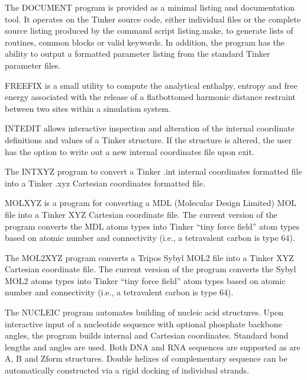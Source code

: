 \documentclass[letterpaper,11pt,english]{sphinxmanual}
\begin{document}

The DOCUMENT program is provided as a minimal listing and documentation tool. It operates on the Tinker source code, either individual files or the complete source listing produced by the command script listing.make, to generate lists of routines, common blocks or valid keywords. In addition, the program has the ability to output a formatted parameter listing from the standard Tinker parameter files.


FREEFIX is a small utility to compute the analytical enthalpy, entropy and free energy associated with the release of a flat\sphinxhyphen{}bottomed harmonic distance restraint between two sites within a simulation system.


INTEDIT allows interactive inspection and alteration of the internal coordinate definitions and values of a Tinker structure. If the structure is altered, the user has the option to write out a new internal coordinates file upon exit.


The INTXYZ program to convert a Tinker .int internal coordinates formatted file into a Tinker .xyz Cartesian coordinates formatted file.


MOLXYZ is a program for converting a MDL (Molecular Design Limited) MOL file into a Tinker XYZ Cartesian coordinate file. The current version of the program converts the MDL atoms types into Tinker “tiny force field” atom types based on atomic number and connectivity (i.e., a tetravalent carbon is type 64).


The MOL2XYZ program converts a Tripos Sybyl MOL2 file into a Tinker XYZ Cartesian coordinate file. The current version of the program converts the Sybyl MOL2 atoms types into Tinker “tiny force field” atom types based on atomic number and connectivity (i.e., a tetravalent carbon is type 64).


The NUCLEIC program automates building of nucleic acid structures. Upon interactive input of a nucleotide sequence with optional phosphate backbone angles, the program builds internal and Cartesian coordinates. Standard bond lengths and angles are used. Both DNA and RNA sequences are supported as are A\sphinxhyphen{}, B\sphinxhyphen{} and Z\sphinxhyphen{}form structures. Double helixes of complementary sequence can be automatically constructed via a rigid docking of individual strands.
\end{document}

